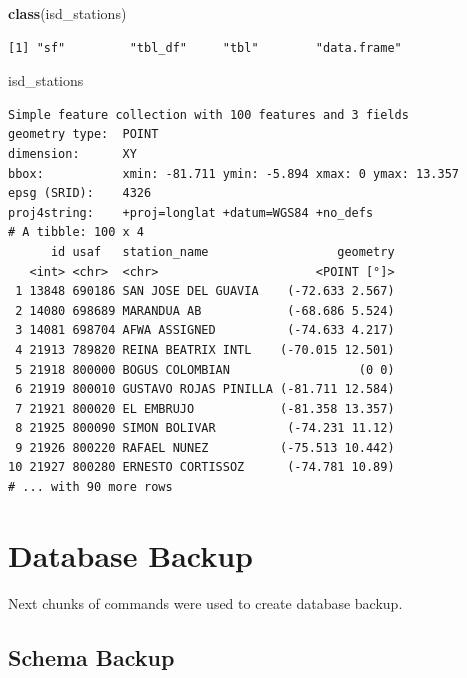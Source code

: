 \documentclass[12pt,twoside]{reedthesis}
\newenvironment{Shaded}{\begin{snugshade}}{\end{snugshade}}
\newcommand{\KeywordTok}[1]{\textcolor[rgb]{0.13,0.29,0.53}{\textbf{#1}}}
\newcommand{\NormalTok}[1]{#1}
\begin{document}
\vspace{0.4cm}
\begin{Shaded}
\begin{Highlighting}[]
        \KeywordTok{class}\NormalTok{(isd_stations)}
\end{Highlighting}
\end{Shaded}
\begin{verbatim}
[1] "sf"         "tbl_df"     "tbl"        "data.frame"
\end{verbatim}
\vspace{0.4cm}
\begin{Shaded}
\begin{Highlighting}[]
\NormalTok{        isd_stations}
\end{Highlighting}
\end{Shaded}
\begin{verbatim}
Simple feature collection with 100 features and 3 fields
geometry type:  POINT
dimension:      XY
bbox:           xmin: -81.711 ymin: -5.894 xmax: 0 ymax: 13.357
epsg (SRID):    4326
proj4string:    +proj=longlat +datum=WGS84 +no_defs
# A tibble: 100 x 4
      id usaf   station_name                  geometry
   <int> <chr>  <chr>                      <POINT [°]>
 1 13848 690186 SAN JOSE DEL GUAVIA    (-72.633 2.567)
 2 14080 698689 MARANDUA AB            (-68.686 5.524)
 3 14081 698704 AFWA ASSIGNED          (-74.633 4.217)
 4 21913 789820 REINA BEATRIX INTL    (-70.015 12.501)
 5 21918 800000 BOGUS COLOMBIAN                  (0 0)
 6 21919 800010 GUSTAVO ROJAS PINILLA (-81.711 12.584)
 7 21921 800020 EL EMBRUJO            (-81.358 13.357)
 8 21925 800090 SIMON BOLIVAR          (-74.231 11.12)
 9 21926 800220 RAFAEL NUNEZ          (-75.513 10.442)
10 21927 800280 ERNESTO CORTISSOZ      (-74.781 10.89)
# ... with 90 more rows
\end{verbatim}
\normalsize

\hypertarget{database-backup}{%
\section{Database Backup}\label{database-backup}}

Next chunks of commands were used to create database backup.

\hypertarget{schema-backup}{%
\subsection{Schema Backup}\label{schema-backup}}

\scriptsize
\end{document}

